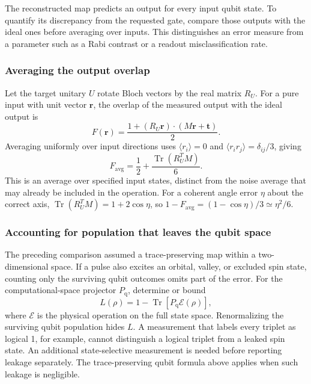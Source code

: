 The reconstructed map predicts an output for every input qubit state.
To quantify its discrepancy from the requested gate, compare those
outputs with the ideal ones before averaging over inputs. This
distinguishes an error measure from a parameter such as a Rabi
contrast or a readout misclassification rate.

\subsubsection{Averaging the output overlap}
Let the target unitary $U$ rotate Bloch vectors by the real matrix
$R_U$. For a pure input with unit vector $\mathbf r$, the overlap
of the measured output with the ideal output is
\[
 F(\mathbf r)=
 \frac{1+(R_U\mathbf r)\cdot(M\mathbf r+\mathbf t)}2.
\]
Averaging uniformly over input directions uses
$\langle r_i\rangle=0$ and
$\langle r_i r_j\rangle=\delta_{ij}/3$, giving
\begin{equation}
 F_{\mathrm{avg}}=\frac12+
            \frac{\operatorname{Tr}(R_U^T M)}6.
 \label{eq:calibration-average-fidelity}
\end{equation}
This is an average over specified input states, distinct from the
noise average that may already be included in the operation.
For a coherent angle error $\eta$ about the correct axis,
$\operatorname{Tr}(R_U^TM)=1+2\cos\eta$, so
$1-F_{\mathrm{avg}}=(1-\cos\eta)/3\simeq\eta^2/6$.

\subsubsection{Accounting for population that leaves the qubit space}
The preceding comparison assumed a trace-preserving map within a
two-dimensional space. If a pulse also excites an orbital, valley,
or excluded spin state, counting only the surviving qubit outcomes
omits part of the error. For the computational-space projector
$P_{\mathrm q}$, determine or bound
\begin{equation}
 L(\rho)=1-\operatorname{Tr}[P_{\mathrm q}\mathcal E(\rho)],
 \label{eq:calibration-leakage-probability}
\end{equation}
where $\mathcal E$ is the physical operation on the full state space.
Renormalizing the surviving qubit population hides $L$.
A measurement that labels every triplet as logical 1, for example,
cannot distinguish a logical triplet from a leaked spin state.
An additional state-selective measurement is needed before reporting
leakage separately. The trace-preserving qubit formula above applies
when such leakage is negligible.

